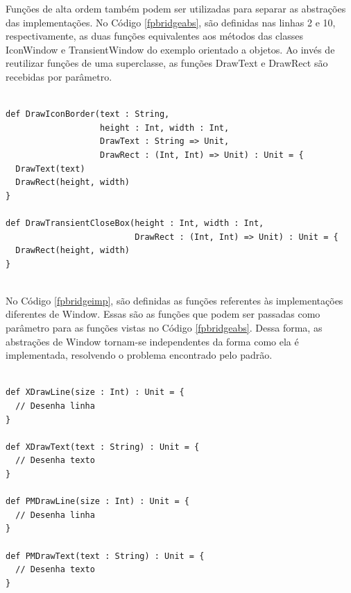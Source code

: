 Funções de alta ordem também podem ser utilizadas 
para separar as abstrações das implementações. 
No Código \ref{fpbridgeabs}, são definidas nas 
linhas 2 e 10, respectivamente, as 
duas funções equivalentes aos métodos das 
classes IconWindow e TransientWindow do exemplo 
orientado a objetos. Ao invés de reutilizar 
funções de uma superclasse, as funções 
DrawText e DrawRect são recebidas por parâmetro.

\begin{lstlisting}[caption={Abstrações no Bridge Funcional.},label=fpbridgeabs]
    
def DrawIconBorder(text : String,
                   height : Int, width : Int,
                   DrawText : String => Unit,
                   DrawRect : (Int, Int) => Unit) : Unit = {
  DrawText(text)
  DrawRect(height, width)
}

def DrawTransientCloseBox(height : Int, width : Int,
                          DrawRect : (Int, Int) => Unit) : Unit = {
  DrawRect(height, width)
}
    
\end{lstlisting}

No Código \ref{fpbridgeimp}, são definidas as 
funções referentes às implementações diferentes 
de Window. Essas são as funções que podem ser 
passadas como parâmetro para as funções vistas 
no Código \ref{fpbridgeabs}. Dessa forma, as 
abstrações de Window tornam-se independentes 
da forma como ela é implementada, resolvendo 
o problema encontrado pelo padrão.

\begin{lstlisting}[caption={Implementações no Bridge Funcional.},label=fpbridgeimp]
    
def XDrawLine(size : Int) : Unit = {
  // Desenha linha
}

def XDrawText(text : String) : Unit = {
  // Desenha texto
}

def PMDrawLine(size : Int) : Unit = {
  // Desenha linha
}

def PMDrawText(text : String) : Unit = {
  // Desenha texto
}
    
\end{lstlisting}